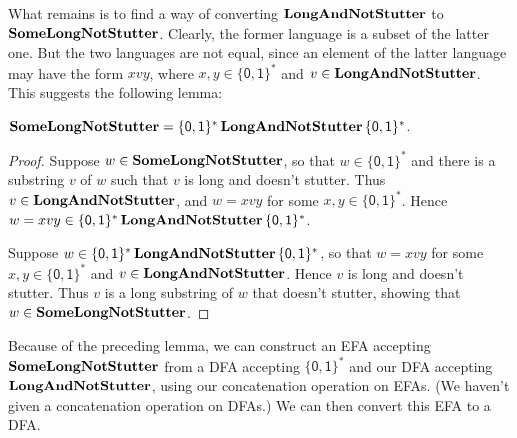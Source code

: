 What remains is to find a way of converting $\mathbf{LongAndNotStutter}$
to $\mathbf{SomeLongNotStutter }$.  Clearly, the former language is
a subset of the latter one.  But the two languages are not equal,
since an element of the latter language may have the form
$xvy$, where $x,y\in\{\mathsf{0,1}\}^*$ and $v\in\mathbf{LongAndNotStutter}$.
This suggests the following lemma:

\begin{lemma}
\label{Stutter3}
$\mathbf{SomeLongNotStutter } =
\{\mathsf{0,1}\}^*\,\mathbf{LongAndNotStutter}\,\{\mathsf{0,1}\}^*$.
\end{lemma}

\begin{proof}
Suppose $w\in\mathbf{SomeLongNotStutter }$, so that $w\in\{\mathsf{0,1}\}^*$
and there is a substring $v$ of $w$ such that $v$ is long and doesn't
stutter.  Thus $v\in\mathbf{LongAndNotStutter}$, and $w=xvy$ for some
$x,y\in\{\mathsf{0,1}\}^*$.  Hence
$w=xvy\in\{\mathsf{0,1}\}^*\,\mathbf{LongAndNotStutter}\,\{\mathsf{0,1}\}^*$.

Suppose $w\in
\{\mathsf{0,1}\}^*\,\mathbf{LongAndNotStutter}\,\{\mathsf{0,1}\}^*$,
so that $w=xvy$ for some $x,y\in\{\mathsf{0,1}\}^*$ and
$v\in\mathbf{LongAndNotStutter}$.  Hence $v$ is long and doesn't stutter.
Thus $v$ is a long substring of $w$ that doesn't stutter,
showing that $w\in\mathbf{SomeLongNotStutter }$.
\end{proof}

Because of the preceding lemma, we can construct an EFA accepting
$\mathbf{SomeLongNotStutter }$ from a DFA accepting $\{\mathsf{0,1}\}^*$ and
our DFA accepting $\mathbf{LongAndNotStutter}$, using our concatenation
operation on EFAs.  (We haven't given a concatenation operation on
DFAs.)  We can then convert this EFA to a DFA.

